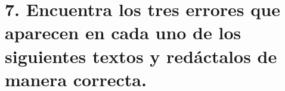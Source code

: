 
%
%
%


\section*{\textcolor{waveBlue2}{7. }Encuentra los tres errores que aparecen en cada uno de los siguientes textos y redáctalos de manera correcta.}

